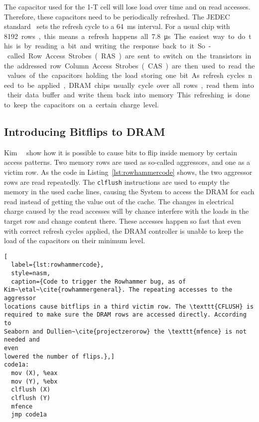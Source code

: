 The capacitor used for the 1-T cell will lose load over time and on read
accesses. Therefore, these capacitors need to be periodically refreshed. The
JEDEC standard~\cite{jedec} sets the refresh cycle to a \SI{64}{\milli\second}
interval. For a usual chip with \SI{8192} rows, this means a refresh happens all
\SI{7.8}{\micro\second}. The easiest way to do this is by reading a bit and
writing the response back to it. So-called Row Access Strobes (RAS) are sent to
switch on the transistors in the addressed row. Column Access Strobes (CAS) are
then used to read the values of the capacitors holding the load storing one bit.
As refresh cycles need to be applied, DRAM chips usually cycle over all rows,
read them into their data buffer and write them back into memory. This
refreshing is done to keep the capacitors on a certain charge level.

\subsection{Introducing Bitflips to DRAM}

Kim~\etal~\cite{rowhammergeneral} show how it is possible to cause bits to flip
inside memory by certain access patterns. Two memory rows are used as so-called
aggressors, and one as a victim row. As the code in
Listing~\ref{lst:rowhammercode} shows, the two aggressor rows are read
repeatedly.  The \texttt{clflush} instructions are used to empty the memory in
the used cache lines, causing the System to access the DRAM for each read
instead of getting the value out of the cache. The changes in electrical charge
caused by the read accesses will by chance interfere with the loads in the
target row and change content there. These accesses happen so fast that even
with correct refresh cycles applied, the DRAM controller is unable to keep the
load of the capacitors on their minimum level.

\begin{minipage}{\linewidth}
\begin{lstlisting}[
  label={lst:rowhammercode},
  style=nasm,
  caption={Code to trigger the Rowhammer bug, as of
Kim~\etal~\cite{rowhammergeneral}. The repeating accesses to the aggressor
locations cause bitflips in a third victim row. The \texttt{CFLUSH} is
required to make sure the DRAM rows are accessed directly. According to
Seaborn and Dullien~\cite{projectzerorow} the \texttt{mfence} is not needed and
even
lowered the number of flips.},]
code1a:
  mov (X), %eax
  mov (Y), %ebx
  clflush (X)
  clflush (Y)
  mfence
  jmp code1a
\end{lstlisting}
\end{minipage}

